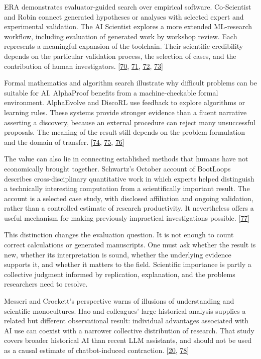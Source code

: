 ERA demonstrates evaluator-guided search over empirical software. Co-Scientist and Robin connect generated hypotheses or analyses with selected expert and experimental validation. The AI Scientist explores a more extended ML-research workflow, including evaluation of generated work by workshop review. Each represents a meaningful expansion of the toolchain. Their scientific credibility depends on the particular validation process, the selection of cases, and the contribution of human investigators. [\hyperlink{ref-era2026}{70}, \hyperlink{ref-coscientist2026}{71}, \hyperlink{ref-robin2026}{72}, \hyperlink{ref-aiscientist2026}{73}]


Formal mathematics and algorithm search illustrate why difficult problems can be suitable for AI. AlphaProof benefits from a machine-checkable formal environment. AlphaEvolve and DiscoRL use feedback to explore algorithms or learning rules. These systems provide stronger evidence than a fluent narrative asserting a discovery, because an external procedure can reject many unsuccessful proposals. The meaning of the result still depends on the problem formulation and the domain of transfer. [\hyperlink{ref-alphaproof2025}{74}, \hyperlink{ref-alphaevolve2025}{75}, \hyperlink{ref-discorl2025}{76}]


The value can also lie in connecting established methods that humans have not economically brought together. Schwartz's October account of BootLoops describes cross-disciplinary quantitative work in which experts helped distinguish a technically interesting computation from a scientifically important result. The account is a selected case study, with disclosed affiliation and ongoing validation, rather than a controlled estimate of research productivity. It nevertheless offers a useful mechanism for making previously impractical investigations possible. [\hyperlink{ref-schwartz2026}{77}]


This distinction changes the evaluation question. It is not enough to count correct calculations or generated manuscripts. One must ask whether the result is new, whether its interpretation is sound, whether the underlying evidence supports it, and whether it matters to the field. Scientific importance is partly a collective judgment informed by replication, explanation, and the problems researchers need to resolve.


Messeri and Crockett's perspective warns of illusions of understanding and scientific monocultures. Hao and colleagues' large historical analysis supplies a related but different observational result: individual advantages associated with AI use can coexist with a narrower collective distribution of research. That study covers broader historical AI than recent LLM assistants, and should not be used as a causal estimate of chatbot-induced contraction. [\hyperlink{ref-messeri2024}{20}, \hyperlink{ref-hao2026}{78}]


